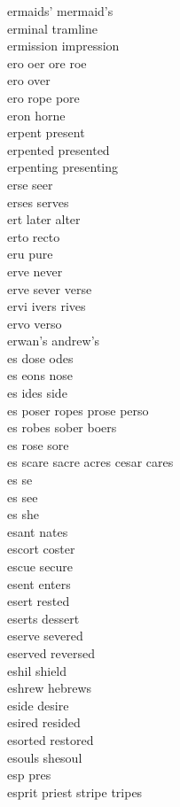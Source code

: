ermaids' mermaid's \\
erminal tramline \\
ermission impression \\
ero oer ore roe\\
ero over \\
ero rope pore \\
eron horne \\
erpent present \\
erpented presented \\
erpenting presenting \\
erse seer\\
erses serves \\
ert later alter  \\
erto recto \\
eru pure \\
erve never \\
erve sever verse \\
ervi ivers rives \\
ervo verso \\
erwan's andrew's \\
es dose odes  \\
es eons nose  \\
es ides side  \\
es poser ropes prose perso   \\
es robes sober boers   \\
es rose sore  \\
es scare sacre acres cesar cares   \\
es se\\
es see \\
es she \\
esant nates\\
escort coster\\
escue secure \\
esent enters \\
esert rested \\
eserts dessert \\
eserve severed \\
eserved reversed \\
eshil shield \\
eshrew hebrews \\
eside desire \\
esired resided \\
esorted restored \\
esouls shesoul \\
esp pres \\
esprit priest stripe tripes\\
